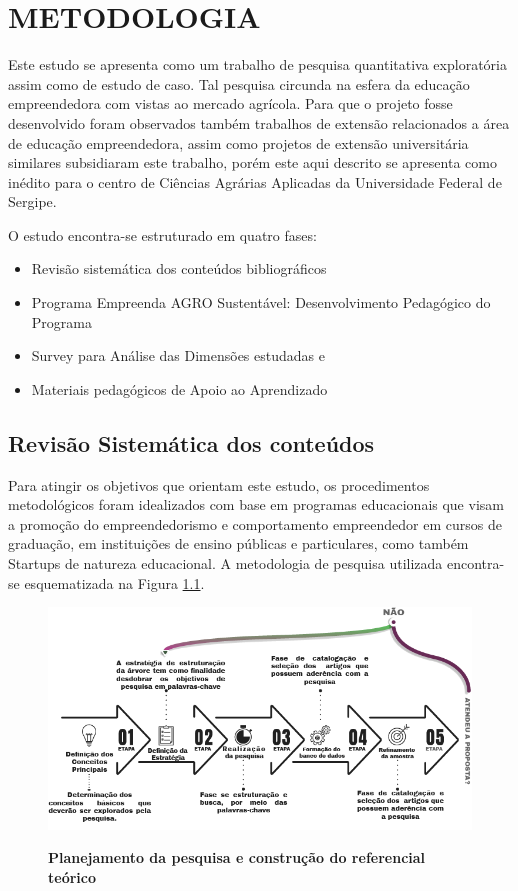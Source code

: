 \chapter{METODOLOGIA}

Este estudo se apresenta como um trabalho de pesquisa quantitativa exploratória assim como de estudo de caso. Tal pesquisa circunda na esfera da educação empreendedora com vistas ao mercado agrícola. Para que o projeto fosse desenvolvido foram observados também trabalhos de extensão relacionados a área de educação empreendedora, assim como projetos de extensão universitária similares subsidiaram este trabalho, porém este aqui descrito se apresenta como inédito para o centro de Ciências Agrárias Aplicadas da Universidade Federal de Sergipe.

O estudo encontra-se estruturado em quatro fases: 

\begin{itemize}
    \item Revisão sistemática dos conteúdos bibliográficos
    \item Programa Empreenda AGRO Sustentável: Desenvolvimento Pedagógico do Programa
    \item Survey para Análise das Dimensões estudadas e
    \item Materiais pedagógicos de Apoio ao Aprendizado
\end{itemize}



\section{Revisão Sistemática dos conteúdos}

Para atingir os objetivos que orientam este estudo, os procedimentos metodológicos foram idealizados com base em programas educacionais que visam a promoção do empreendedorismo e comportamento empreendedor em cursos de graduação, em instituições de ensino públicas e particulares, como também Startups de natureza educacional. A metodologia de pesquisa utilizada encontra-se esquematizada na Figura \ref{figura_29}. 

\begin{figure}[H]
\centering
\caption{\textbf{Planejamento da pesquisa e construção do referencial teórico}}
\includegraphics[scale=0.6]{Imagens/fases_pesquisa_bibliografica.png}
\label{figura_29}
\end{figure}


